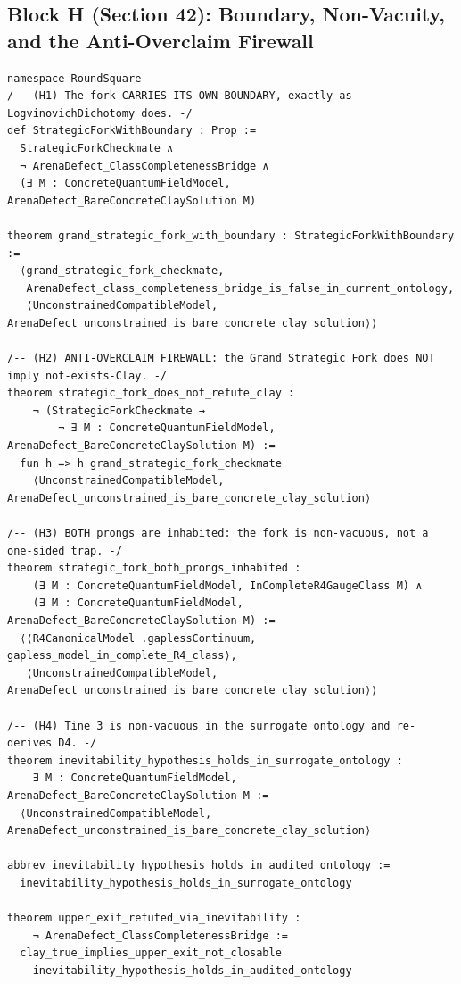 \documentclass[11pt,a4paper]{article}
\theoremstyle{plain}
\theoremstyle{definition}
\theoremstyle{remark}
\renewcommand{\_}{\oldunderscore\allowbreak}
\begin{document}
\subsection{Block H (Section 42): Boundary, Non-Vacuity, and the Anti-Overclaim Firewall}
\begin{lstlisting}
namespace RoundSquare
/-- (H1) The fork CARRIES ITS OWN BOUNDARY, exactly as LogvinovichDichotomy does. -/
def StrategicForkWithBoundary : Prop :=
  StrategicForkCheckmate ∧
  ¬ ArenaDefect_ClassCompletenessBridge ∧
  (∃ M : ConcreteQuantumFieldModel, ArenaDefect_BareConcreteClaySolution M)

theorem grand_strategic_fork_with_boundary : StrategicForkWithBoundary :=
  ⟨grand_strategic_fork_checkmate,
   ArenaDefect_class_completeness_bridge_is_false_in_current_ontology,
   ⟨UnconstrainedCompatibleModel, ArenaDefect_unconstrained_is_bare_concrete_clay_solution⟩⟩

/-- (H2) ANTI-OVERCLAIM FIREWALL: the Grand Strategic Fork does NOT imply not-exists-Clay. -/
theorem strategic_fork_does_not_refute_clay :
    ¬ (StrategicForkCheckmate →
        ¬ ∃ M : ConcreteQuantumFieldModel, ArenaDefect_BareConcreteClaySolution M) :=
  fun h => h grand_strategic_fork_checkmate
    ⟨UnconstrainedCompatibleModel, ArenaDefect_unconstrained_is_bare_concrete_clay_solution⟩

/-- (H3) BOTH prongs are inhabited: the fork is non-vacuous, not a one-sided trap. -/
theorem strategic_fork_both_prongs_inhabited :
    (∃ M : ConcreteQuantumFieldModel, InCompleteR4GaugeClass M) ∧
    (∃ M : ConcreteQuantumFieldModel, ArenaDefect_BareConcreteClaySolution M) :=
  ⟨⟨R4CanonicalModel .gaplessContinuum, gapless_model_in_complete_R4_class⟩,
   ⟨UnconstrainedCompatibleModel, ArenaDefect_unconstrained_is_bare_concrete_clay_solution⟩⟩

/-- (H4) Tine 3 is non-vacuous in the surrogate ontology and re-derives D4. -/
theorem inevitability_hypothesis_holds_in_surrogate_ontology :
    ∃ M : ConcreteQuantumFieldModel, ArenaDefect_BareConcreteClaySolution M :=
  ⟨UnconstrainedCompatibleModel, ArenaDefect_unconstrained_is_bare_concrete_clay_solution⟩

abbrev inevitability_hypothesis_holds_in_audited_ontology :=
  inevitability_hypothesis_holds_in_surrogate_ontology

theorem upper_exit_refuted_via_inevitability :
    ¬ ArenaDefect_ClassCompletenessBridge :=
  clay_true_implies_upper_exit_not_closable
    inevitability_hypothesis_holds_in_audited_ontology


\end{lstlisting}
\end{document}
